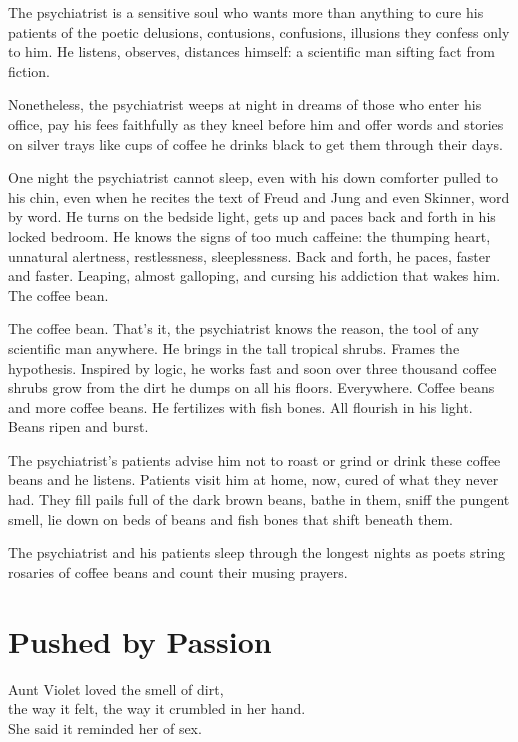 \documentclass[twoside,10pt]{book}
\begin{document}
The psychiatrist is a sensitive soul who wants more than anything to
cure his patients of the poetic delusions, contusions, confusions,
illusions they confess only to him. He listens, observes, distances
himself: a scientific man sifting fact from fiction.

Nonetheless, the psychiatrist weeps at night in dreams of those who
enter his office, pay his fees faithfully as they kneel before him and
offer words and stories on silver trays like cups of coffee he drinks
black to get them through their days.

One night the psychiatrist cannot sleep, even with his down comforter
pulled to his chin, even when he recites the text of Freud and Jung and
even Skinner, word by word. He turns on the bedside light, gets up and
paces back and forth in his locked bedroom. He knows the signs of too
much caffeine: the thumping heart, unnatural alertness, restlessness,
sleeplessness. Back and forth, he paces, faster and faster. Leaping,
almost galloping, and cursing his addiction that wakes him. The coffee
bean.

The coffee bean. That's it, the psychiatrist knows the reason, the tool
of any scientific man anywhere. He brings in the tall tropical shrubs.
Frames the hypothesis. Inspired by logic, he works fast and soon over
three thousand coffee shrubs grow from the dirt he dumps on all his
floors. Everywhere. Coffee beans and more coffee beans. He fertilizes
with fish bones. All flourish in his light. Beans ripen and burst.

The psychiatrist's patients advise him not to roast or grind or drink
these coffee beans and he listens. Patients visit him at home, now,
cured of what they never had. They fill pails full of the dark brown
beans, bathe in them, sniff the pungent smell, lie down on beds of beans
and fish bones that shift beneath them.

The psychiatrist and his patients sleep through the longest nights as
poets string rosaries of coffee beans and count their musing prayers.


\clearpage
\section{Pushed by Passion}

Aunt Violet loved the smell of dirt,\\
the way it felt, the way it crumbled in her hand.\\
She said it reminded her of sex.
\end{document}
